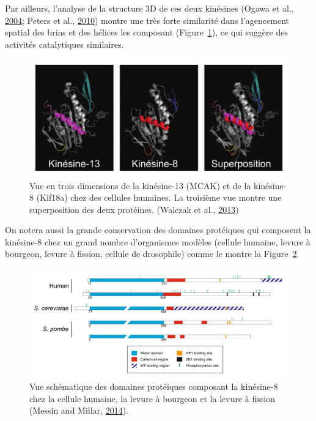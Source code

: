 \documentclass[12pt,a4paper,twoside,openright]{book}
\begin{document}
Par ailleurs, l'analyse de la structure 3D de ces deux kinésines (Ogawa
et al., \hyperref[ref-Ogawa2004]{2004}; Peters et al.,
\hyperref[ref-Peters2010]{2010}) montre une très forte similarité dans
l'agencement spatial des brins et des hélices les composant
(Figure~\ref{fig:dep_kinesin}), ce qui suggère des activités
catalytiques similaires.

\begin{figure}[htbp]
\centering
\includegraphics{figures/intro/dep_kinesin.png}
\caption[Reconstruction 3D des kinésines dépolymérisatrice]{\label{fig:dep_kinesin}Vue
en trois dimensions de la kinésine-13 (MCAK) et de la kinésine-8
(Kif18a) chez des cellules humaines. La troisième vue montre une
superposition des deux protéines. (Walczak et al.,
\hyperref[ref-Walczak2013a]{2013})}
\end{figure}

On notera aussi la grande conservation des domaines protéiques qui
composent la kinésine-8 chez un grand nombre d'organismes modèles
(cellule humaine, levure à bourgeon, levure à fission, cellule de
drosophile) comme le montre la Figure~\ref{fig:proteicdomain}.

\begin{figure}[htbp]
\centering
\includegraphics{figures/intro/proteicdomain.png}
\caption[Les domaines protéiques des différentes kinésine-8]{\label{fig:proteicdomain}Vue
schématique des domaines protéiques composant la kinésine-8 chez la
cellule humaine, la levure à bourgeon et la levure à fission (Messin and
Millar, \hyperref[ref-Messin2014]{2014}).}
\end{figure}
\end{document}
